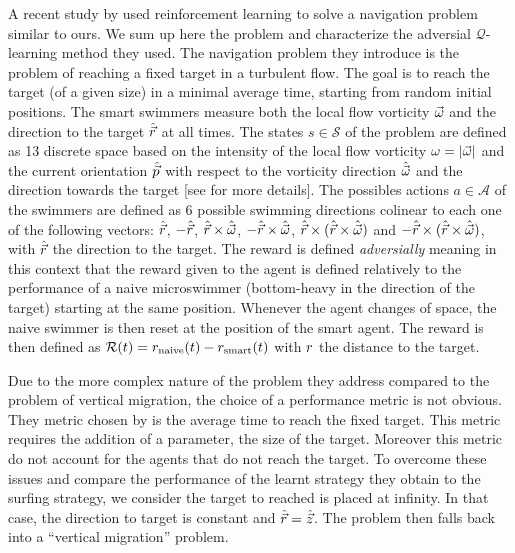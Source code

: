 A recent study by \citet{Alageshan2020} used reinforcement learning to solve a navigation problem similar to ours.
We sum up here the problem and characterize the adversial $\mathcal{Q}$-learning method they used.
The navigation problem they introduce is the problem of reaching a fixed target in a turbulent flow.
The goal is to reach the target (of a given size) in a minimal average time, starting from random initial positions.
The smart swimmers measure both the local flow vorticity $\vec{\omega}$ and the direction to the target $\hat{\vec{r}}$ at all times.
The states $s \in \mathcal{S}$ of the problem are defined as 13 discrete space based on the intensity of the local flow vorticity $\omega = \lvert\vec{\omega}\rvert$ and the current orientation $\hat{\vec{p}}$ with respect to the vorticity direction $\hat{\vec{\omega}}$ and the direction towards the target [see \citet{alageshan2020machine} for more details].
The possibles actions $a \in \mathcal{A}$ of the swimmers are defined as 6 possible swimming directions colinear to each one of the following vectors: $\hat{\vec{r}}$, $-\hat{\vec{r}}$, $\hat{\vec{r}} \times \hat{\vec{\omega}}$, $-\hat{\vec{r}} \times \hat{\vec{\omega}}$, $\hat{\vec{r}} \times (\hat{\vec{r}} \times \hat{\vec{\omega}})$ and $-\hat{\vec{r}} \times (\hat{\vec{r}} \times \hat{\vec{\omega}})$, with $\hat{\vec{r}}$ the direction to the target.
The reward is defined \textit{adversially} meaning in this context that the reward given to the agent is defined relatively to the performance of a naive microswimmer (bottom-heavy in the direction of the target) starting at the same position.
Whenever the agent changes of space, the naive swimmer is then reset at the position of the smart agent.
The reward is then defined as $\mathcal{R}(t) = r_{\mathrm{naive}}(t) - r_{\mathrm{smart}}(t)$ with $r$ the distance to the target.

Due to the more complex nature of the problem they address compared to the problem of vertical migration, the choice of a performance metric is not obvious.
They metric chosen by \citet{Alageshan2020} is the average time to reach the fixed target. 
This metric requires the addition of a parameter, the size of the target. 
Moreover this metric do not account for the agents that do not reach the target.
To overcome these issues and compare the performance of the learnt strategy they obtain to the surfing strategy, we consider the target to reached is placed at infinity.
In that case, the direction to target is constant and $\hat{\vec{r}} = \hat{\vec{z}}$.
The problem then falls back into a ``vertical migration'' problem.

